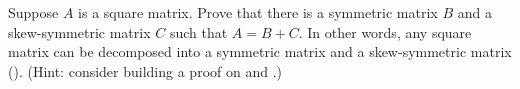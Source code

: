 Suppose $A$ is a square matrix.  Prove that there is a symmetric matrix $B$ and a skew-symmetric matrix $C$ such that $A=B+C$.  In other words, any square matrix can be decomposed into a symmetric matrix and a skew-symmetric matrix ().  (Hint: consider building a proof on  and .)